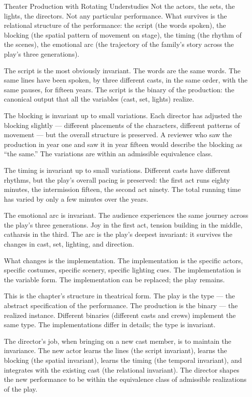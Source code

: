 \begin{coda}{Theater Production with Rotating Understudies}
Not the actors, the sets, the lights, the directors. Not any
particular performance. What survives is the relational structure
of the performance: the script (the words spoken), the blocking
(the spatial pattern of movement on stage), the timing (the rhythm
of the scenes), the emotional arc (the trajectory of the family's
story across the play's three generations).

The script is the most obviously invariant. The words are the same
words. The same lines have been spoken, by three different casts,
in the same order, with the same pauses, for fifteen years. The
script is the binary of the production: the canonical output that
all the variables (cast, set, lights) realize.

The blocking is invariant up to small variations. Each director has
adjusted the blocking slightly --- different placements of the
characters, different patterns of movement --- but the overall
structure is preserved. A reviewer who saw the production in year
one and saw it in year fifteen would describe the blocking as
``the same.'' The variations are within an admissible equivalence
class.

The timing is invariant up to small variations. Different casts
have different rhythms, but the play's overall pacing is preserved:
the first act runs eighty minutes, the intermission fifteen, the
second act ninety. The total running time has varied by only a
few minutes over the years.

The emotional arc is invariant. The audience experiences the same
journey across the play's three generations. Joy in the first act,
tension building in the middle, catharsis in the third. The arc is
the play's deepest invariant: it survives the changes in cast,
set, lighting, and direction.

What changes is the implementation. The implementation is the
specific actors, specific costumes, specific scenery, specific
lighting cues. The implementation is the variable form. The
implementation can be replaced; the play remains.

This is the chapter's structure in theatrical form. The play is
the type --- the abstract specification of the performance. The
production is the binary --- the realized instance. Different
binaries (different casts and crews) implement the same type. The
implementations differ in details; the type is invariant.

The director's job, when bringing on a new cast member, is to
maintain the invariance. The new actor learns the lines (the
script invariant), learns the blocking (the spatial invariant),
learns the timing (the temporal invariant), and integrates with
the existing cast (the relational invariant). The director
shapes the new performance to be within the equivalence class of
admissible realizations of the play.


\end{coda}
